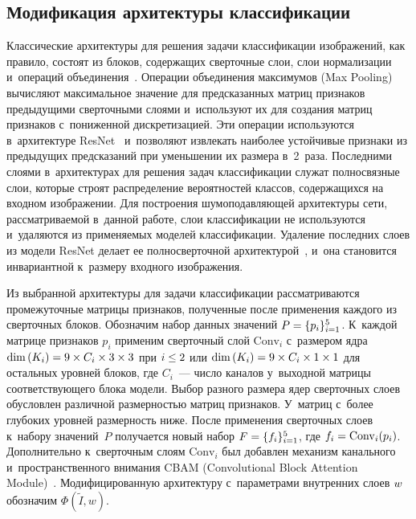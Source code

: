 \begin{multicols}{2}
\subsection{Модификация архитектуры классификации}

Классические архитектуры для решения задачи классификации изображений, как 
правило, состоят из блоков, содержащих сверточные слои, слои нормализации 
и~операций объединения~\cite{POOLOPS}. Операции объединения максимумов (Max 
Pooling) вычисляют максимальное значение для предсказанных матриц признаков 
предыдущими сверточными слоями и~используют их для создания матриц признаков 
с~пониженной дискретизацией. Эти операции используются в~архитектуре 
ResNet~\cite{ResNet} и~позволяют извлекать наиболее устойчивые признаки из 
предыдущих предсказаний при уменьшении их размера в~2~раза. Последними слоями 
в~архитектурах для решения задач классификации служат полносвязные слои, которые 
строят распределение вероятностей классов, содержащихся на входном изображении. 
Для построения шумоподавляющей архитектуры сети, рассматриваемой в~данной 
работе, слои классификации не используются и~удаляются из применяемых моделей 
классификации. Удаление последних слоев из модели ResNet делает ее 
полносверточной архитектурой~\cite{FULLYCONV}, и~она становится инвариантной к~размеру входного изоб\-ра\-же\-ния.

Из выбранной архитектуры для задачи классификации рассматриваются промежуточные 
мат\-ри\-цы признаков, полученные после применения каж\-до\-го из сверточных блоков. 
Обозначим набор данных значений $P \hm= \{p_{i}\}_{i=1}^{5}$. К~каждой матрице 
признаков $p_{i}$ применим сверточный слой $\mathrm{Conv}_{i}$ с~размером ядра $\mathrm{dim}\,(K_i) 
\hm= 9 \times C_{i} \times 3 \times 3$ при $i \hm\leq 2$ или $\mathrm{dim}\,(K_i) \hm= 9 \times 
C_{i} \times 1 \times 1$ для остальных уровней блоков, где $C_{i}$~--- число 
каналов у~выходной матрицы соответствующего блока модели. Выбор разного размера 
ядер сверточных слоев обуслов\-лен различной размерностью мат\-риц признаков. 
У~мат\-риц с~более глубоких уровней размерность ниже. После применения сверточных 
слоев к~набору значений~$P$ получается новый набор $F \hm= \{f_{i}\}_{i=1}^5$, где 
$f_i\hm = \mathrm{Conv}_i(p_i)$. Дополнительно к~сверточным слоям $\mathrm{Conv}_{i}$ был добавлен 
механизм канального и~пространственного внимания CBAM (Convolutional Block Attention Module)~\cite{CBAMCB}.  
Модифицированную архитектуру с~параметрами внутренних слоев $\mathnormal{w}$ 
обозначим $\Phi(\tilde{I}, {w})$.


\end{multicols}
